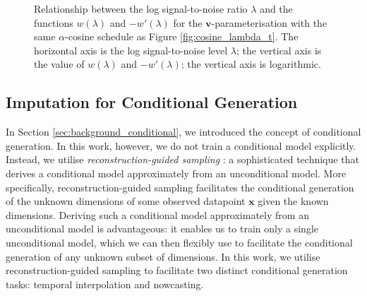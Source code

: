 \documentclass[ oneside,%
                    author={George Herbert},
                    degree={MSci},
                     title={Diffusion Models for Time-Evolving Precipitation Fields},
                  subtitle={}]{dissertation}
\begin{document}
\begin{figure}[htbp]
      \centering
      \caption{Relationship between the log signal-to-noise ratio $\lambda$ and the functions $w(\lambda)$ and $-w'(\lambda)$ for the $\mathbf{v}$-parameterisation with the same $\alpha$-cosine schedule as Figure \ref{fig:cosine_lambda_t}. The horizontal axis is the log signal-to-noise level $\lambda$; the vertical axis is the value of $w(\lambda)$ and $-w'(\lambda)$; the vertical axis is logarithmic.}
      \label{fig:v_prediction_weighting}
\end{figure}

\subsection{Imputation for Conditional Generation}

In Section \ref{sec:background_conditional}, we introduced the concept of conditional generation. In this work, however, we do not train a conditional model explicitly. Instead, we utilise \textit{reconstruction-guided sampling} \cite{VDM_Ho}: a sophisticated technique that derives a conditional model approximately from an unconditional model. More specifically, reconstruction-guided sampling facilitates the conditional generation of the unknown dimensions of some observed datapoint $\mathbf{x}$ given the known dimensions. Deriving such a conditional model approximately from an unconditional model is advantageous: it enables us to train only a single unconditional model, which we can then flexibly use to facilitate the conditional generation of any unknown subset of dimensions.  In this work, we utilise reconstruction-guided sampling to facilitate two distinct conditional generation tasks: temporal interpolation and nowcasting.
\end{document}
